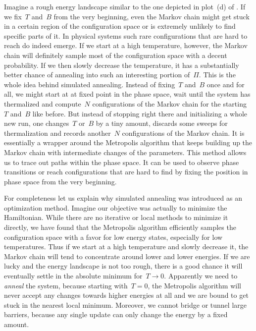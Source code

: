 Imagine a rough energy landscape similar to the one depicted in plot~(d) of
. If we fix~$T$ and~$B$ from the very beginning, even
the Markov chain might get stuck in a certain region of the configuration space
or is extremely unlikely to find specific parts of it. In physical systems such
rare configurations that are hard to reach do indeed emerge. If we start at a
high temperature, however, the Markov chain will definitely sample most of the
configuration space with a decent probability. If we then slowly decrease the
temperature, it has a substantially better chance of annealing into such an
interesting portion of~$\Pi$. This is the whole idea behind simulated annealing.
Instead of fixing~$T$ and~$B$ once and for all, we might start at at fixed point
in the phase space, wait until the system has thermalized and compute~$N$
configurations of the Markov chain for the starting~$T$ and~$B$ like before. But
instead of stopping right there and initializing a whole new run, one
changes~$T$ or~$B$ by a tiny amount, discards some sweeps for thermalization and
records another~$N$ configurations of the Markov chain. It is essentially a
wrapper around the Metropolis algorithm that keeps building up the Markov chain
with intermediate changes of the parameters. This method allows us to trace out
paths within the phase space. It can be used to observe phase transitions or
reach configurations that are hard to find by fixing the position in phase space
from the very beginning.

For completeness let us explain why simulated annealing was introduced as an
optimization method. Imagine our objective was actually to minimize the
Hamiltonian. While there are no iterative or local methods to minimize it
directly, we have found that the Metropolis algorithm efficiently samples the
configuration space with a favor for low energy states, especially for low
temperatures. Thus if we start at a high temperature and slowly decrease it, the
Markov chain will tend to concentrate around lower and lower energies. If we are
lucky and the energy landscape is not too rough, there is a good chance it will
eventually settle in the absolute minimum for~$T \to 0$. Apparently we need to
\emph{anneal} the system, because starting with~$T=0$, the Metropolis algorithm
will never accept any changes towards higher energies at all and we are bound to
get stuck in the nearest local minimum. Moreover, we cannot bridge or tunnel
large barriers, because any single update can only change the energy by a fixed
amount.

